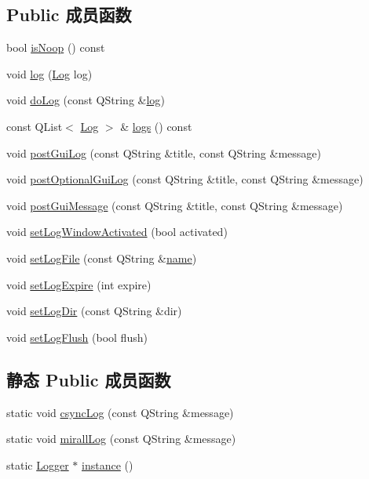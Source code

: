 \subsection*{Public 成员函数}
\begin{DoxyCompactItemize}
\item 
bool \hyperlink{class_o_c_c_1_1_logger_ac5345e3ebe1dbdec237ab27cea140a9d}{is\+Noop} () const
\item 
void \hyperlink{class_o_c_c_1_1_logger_a63b911b609af1a4d550219661be6ca5b}{log} (\hyperlink{struct_o_c_c_1_1_log}{Log} log)
\item 
void \hyperlink{class_o_c_c_1_1_logger_af2ca251c37102fa0460c641ce94fe0b5}{do\+Log} (const Q\+String \&\hyperlink{class_o_c_c_1_1_logger_a63b911b609af1a4d550219661be6ca5b}{log})
\item 
const Q\+List$<$ \hyperlink{struct_o_c_c_1_1_log}{Log} $>$ \& \hyperlink{class_o_c_c_1_1_logger_a20cd402d4dde88f8d26384638ada722c}{logs} () const
\item 
void \hyperlink{class_o_c_c_1_1_logger_a818eb7c51ba7e41eef13eeb0bcec5237}{post\+Gui\+Log} (const Q\+String \&title, const Q\+String \&message)
\item 
void \hyperlink{class_o_c_c_1_1_logger_a91ab11137ca08b29863079279f8060cb}{post\+Optional\+Gui\+Log} (const Q\+String \&title, const Q\+String \&message)
\item 
void \hyperlink{class_o_c_c_1_1_logger_aec60f119d20c0b00b7b94a089f50c75a}{post\+Gui\+Message} (const Q\+String \&title, const Q\+String \&message)
\item 
void \hyperlink{class_o_c_c_1_1_logger_ad3d820118bdd5a873f084e978289b5ab}{set\+Log\+Window\+Activated} (bool activated)
\item 
void \hyperlink{class_o_c_c_1_1_logger_a3ee77b95d847f36b5b7624ea3e26e09b}{set\+Log\+File} (const Q\+String \&\hyperlink{utility_8cpp_a8f8f80d37794cde9472343e4487ba3eb}{name})
\item 
void \hyperlink{class_o_c_c_1_1_logger_a82bcdb38dbc0b80d0c00847e2631f16f}{set\+Log\+Expire} (int expire)
\item 
void \hyperlink{class_o_c_c_1_1_logger_acb0ee8a85ca9d7ae6f92db8b1571278d}{set\+Log\+Dir} (const Q\+String \&dir)
\item 
void \hyperlink{class_o_c_c_1_1_logger_ad7c9b0652108171214c9158e12f3f61b}{set\+Log\+Flush} (bool flush)
\end{DoxyCompactItemize}
\subsection*{静态 Public 成员函数}
\begin{DoxyCompactItemize}
\item 
static void \hyperlink{class_o_c_c_1_1_logger_a8562d44607c559dfeeaa9f4117d3e326}{csync\+Log} (const Q\+String \&message)
\item 
static void \hyperlink{class_o_c_c_1_1_logger_acb48e29c4b97b188a780c600997649f9}{mirall\+Log} (const Q\+String \&message)
\item 
static \hyperlink{class_o_c_c_1_1_logger}{Logger} $\ast$ \hyperlink{class_o_c_c_1_1_logger_ac34876737f0f21499f57bfe2a09e758c}{instance} ()
\end{DoxyCompactItemize}



